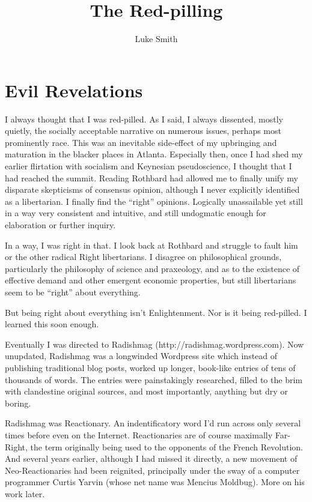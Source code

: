 \documentclass{book}
\title{The Red-pilling}
\author{Luke Smith}
\begin{document}
\maketitle


\chapter{Evil Revelations}

I always thought that I was red-pilled. As I said, I always dissented, mostly quietly, the socially acceptable narrative on numerous issues, perhaps most prominently race. This was an inevitable side-effect of my upbringing and maturation in the blacker places in Atlanta. Especially then, once I had shed my earlier flirtation with socialism and Keynesian pseudoscience, I thought that I had reached the summit. Reading Rothbard had allowed me to finally unify my disparate skepticisms of consensus opinion, although I never explicitly identified as a libertarian. I finally find the ``right'' opinions. Logically unassailable yet still in a way very consistent and intuitive, and still undogmatic enough for elaboration or further inquiry.

In a way, I was right in that. I look back at Rothbard and struggle to fault him or the other radical Right libertarians. I disagree on philosophical grounds, particularly the philosophy of science and praxeology, and as to the existence of effective demand and other emergent economic properties, but still libertarians seem to be ``right'' about everything.

But being right about everything isn't Enlightenment. Nor is it being red-pilled. I learned this soon enough.

Eventually I was directed to Radishmag (http://radishmag.wordpress.com). Now unupdated, Radishmag was a longwinded Wordpress site which instead of publishing traditional blog posts, worked up longer, book-like entries of tens of thousands of words. The entries were painstakingly researched, filled to the brim with clandestine original sources, and most importantly, anything but dry or boring.

Radishmag was Reactionary. An indentificatory word I'd run across only several times before even on the Internet. Reactionaries are of course maximally Far-Right, the term originally being used to the opponents of the French Revolution. And several years earlier, although I had missed it directly, a new movement of Neo-Reactionaries had been reignited, principally under the sway of a computer programmer Curtis Yarvin (whose net name was Mencius Moldbug). More on his work later.
\end{document}
